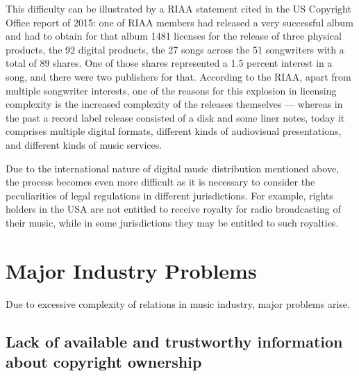 \documentclass[12pt]{report}
\begin{document}
This difficulty can be illustrated by a RIAA statement cited in the US Copyright Office report of 2015: one of RIAA members had released a very successful album and had to obtain for that album 1481 licenses for the release of three physical products, the 92 digital products, the 27 songs across the 51 songwriters with a total of 89 shares. One of those shares represented a 1.5 percent interest in a song, and there were two publishers for that. According to the RIAA, apart from multiple songwriter interests, one of the reasons for this explosion in licensing complexity is the increased complexity of the releases themselves — whereas in the past a record label release consisted of a disk and some liner notes, today it comprises multiple digital formats, different kinds of audiovisual presentations, and different kinds of music services.

Due to the international nature of digital music distribution mentioned above, the process becomes even more difficult as it is necessary to consider the peculiarities of legal regulations in different jurisdictions. For example, rights holders in the USA are not entitled to receive royalty for radio broadcasting of their music, while in some jurisdictions they may be entitled to such royalties.


\section{Major Industry Problems}
\label{industry-problems}
Due to excessive complexity of relations in music industry, major problems arise.

\subsection{Lack of available and trustworthy information about copyright ownership}
\end{document}
